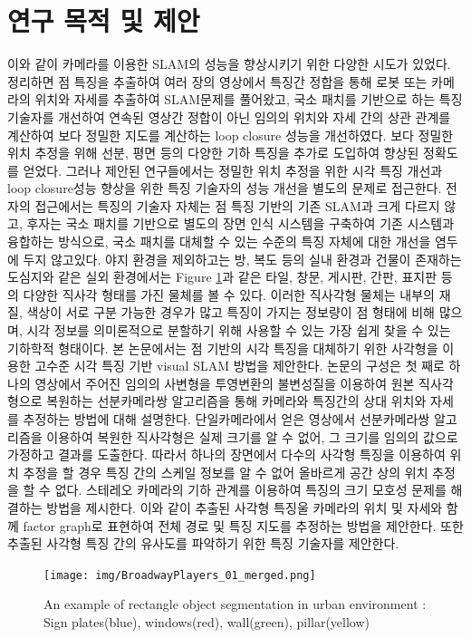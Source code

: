 \documentclass[master,korean,final]{cbnu-ecs}
\begin{document}
\section{연구 목적 및 제안}
이와 같이 카메라를 이용한 SLAM의 성능을 향상시키기 위한 다양한 시도가 있었다. 정리하면 점 특징을 추출하여 여러 장의 영상에서 특징간 정합을 통해 로봇 또는 카메라의 위치와 자세를 추출하여 SLAM문제를 풀어왔고, 국소 패치를 기반으로 하는 특징 기술자를 개선하여 연속된 영상간 정합이 아닌 임의의 위치와 자세 간의 상관 관계를 계산하여 보다 정밀한 지도를 계산하는 loop closure 성능을 개선하였다. 보다 정밀한 위치 추정을 위해 선분, 평면 등의 다양한 기하 특징을 추가로 도입하여 향상된 정확도를 얻었다.
그러나 제안된 연구들에서는 정밀한 위치 추정을 위한 시각 특징 개선과 loop closure성능 향상을 위한 특징 기술자의 성능 개선을 별도의 문제로 접근한다. 전자의 접근에서는 특징의 기술자 자체는 점 특징 기반의 기존 SLAM과 크게 다르지 않고, 후자는 국소 패치를 기반으로 별도의 장면 인식 시스템을 구축하여 기존 시스템과 융합하는 방식으로, 국소 패치를 대체할 수 있는 수준의 특징 자체에 대한 개선을 염두에 두지 않고있다. 
야지 환경을 제외하고는 방, 복도 등의 실내 환경과 건물이 존재하는 도심지와 같은 실외 환경에서는 Figure \ref{envexample}과 같은 타일, 창문, 게시판, 간판, 표지판 등의 다양한 직사각 형태를 가진 물체를 볼 수 있다. 이러한 직사각형 물체는 내부의 재질, 색상이 서로 구분 가능한 경우가 많고 특징이 가지는 정보량이 점 형태에 비해 많으며, 시각 정보를 의미론적으로 분할하기 위해 사용할 수 있는 가장 쉽게 찾을 수 있는 기하학적 형태이다. 본 논문에서는 점 기반의 시각 특징을 대체하기 위한 사각형을 이용한 고수준 시각 특징 기반 visual SLAM 방법을 제안한다.
논문의 구성은 첫 째로 하나의 영상에서 주어진 임의의 사변형을 투영변환의 불변성질을 이용하여 원본 직사각형으로 복원하는 선분카메라쌍 알고리즘을 통해 카메라와 특징간의 상대 위치와 자세를 추정하는 방법에 대해 설명한다. 단일카메라에서 얻은 영상에서 선분카메라쌍 알고리즘을 이용하여 복원한 직사각형은 실제 크기를 알 수 없어, 그 크기를 임의의 값으로 가정하고 결과를 도출한다. 따라서 하나의 장면에서 다수의 사각형 특징을 이용하여 위치 추정을 할 경우 특징 간의 스케일 정보를 알 수 없어 올바르게 공간 상의 위치 추정을 할 수 없다. 스테레오 카메라의 기하 관계를 이용하여 특징의 크기 모호성 문제를 해결하는 방법을 제시한다. 이와 같이 추출된 사각형 특징울 카메라의 위치 및 자세와 함께 factor graph로 표현하여 전체 경로 및 특징 지도를 추정하는 방법을 제안한다. 또한 추출된 사각형 특징 간의 유사도를 파악하기 위한 특징 기술자를 제안한다. 
\newpage
\begin{figure}[!ht]
  \centering
	\texttt{[image: img/BroadwayPlayers\_01\_merged.png]}
  \caption{An example of rectangle object segmentation in urban environment : Sign plates(blue), windows(red), wall(green), pillar(yellow)}
\label{envexample}
\end{figure}
\end{document}
